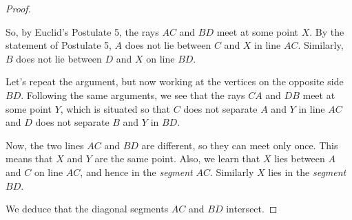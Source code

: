 \documentclass{tufte-handout}
\theoremstyle{definition}
\begin{document}
\begin{proof}
\begin{marginfigure}[-0.75in]
\end{marginfigure}

So, by Euclid's Postulate 5, the rays $AC$ and $BD$ meet at some point $X$. By the statement of Postulate 5, $A$ does not lie between $C$ and $X$ in line $AC$. Similarly, $B$ does not lie between $D$ and $X$ on line $BD$.

Let's repeat the argument, but now working at the vertices on the opposite side $BD$. Following the same arguments, we see that the rays $CA$ and $DB$ meet at some point $Y$, which is situated so that $C$ does not separate $A$ and $Y$ in line $AC$ and $D$ does not separate $B$ and $Y$ in $BD$.

Now, the two lines $AC$ and $BD$ are different, so they can meet only once. This means that $X$ and $Y$ are the same point. Also, we learn that $X$ lies between $A$ and $C$ on line $AC$, and hence in the \emph{segment} $AC$. Similarly $X$ lies in the \emph{segment} $BD$.

We deduce that the diagonal segments $AC$ and $BD$ intersect.
\end{proof}

\clearpage
\end{document}
